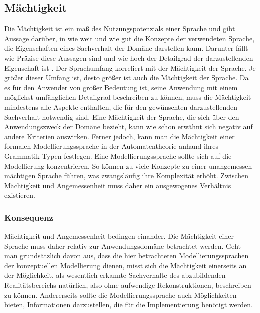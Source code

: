 \subsection{Mächtigkeit}
\label{ssc:Nutzungspotenzial}
Die Mächtigkeit ist ein maß des Nutzungspotenzials einer Sprache und gibt Aussage darüber,
in wie weit und wie gut die Konzepte der verwendeten Sprache, die Eigenschaften eines Sachverhalt der Domäne darstellen kann.
Darunter fällt wie Präzise diese Aussagen sind und wie hoch der Detailgrad der darzustellenden Eigenschaft ist \cite[180]{Allweyer_2005}.
Der Sprachumfang korreliert mit der Mächtigkeit der Sprache. Je größer dieser Umfang ist, desto größer ist auch die Mächtigkeit der Sprache.
Da es für den Anwender von großer Bedeutung ist, seine Anwendung mit einem möglichst umfänglichen Detailgrad beschreiben zu können,
muss die Mächtigkeit mindestens alle Aspekte enthalten, die für den gewünschten darzustellenden Sachverhalt notwendig sind.
Eine Mächtigkeit der Sprache, die sich über den Anwendungszweck der Domäne bezieht, kann wie schon erwähnt sich negativ auf andere Kriterien auswirken.
Ferner jedoch, kann man die Mächtigkeit einer formalen Modellierungssprache in der Automatentheorie anhand ihres Grammatik-Typen festlegen.
Eine Modellierungssprache sollte sich auf die Modellierung konzentrieren.
So können zu viele Konzepte zu einer unangemessen mächtigen Sprache führen, was zwangsläufig ihre Komplexität erhöht. Zwischen Mächtigkeit
und Angemessenheit muss daher ein ausgewogenes Verhältnis existieren.

\subsubsection{Konsequenz}
Mächtigkeit und Angemessenheit bedingen einander. Die Mächtigkeit einer Sprache muss daher relativ
zur Anwendungsdomäne betrachtet werden. Geht man grundsätzlich davon aus, dass die hier betrachteten
Modellierungssprachen der konzeptuellen Modellierung dienen, misst sich die Mächtigkeit einerseits
an der Möglichkeit, als wesentlich erkannte Sachverhalte des abzubildenden Realitätsbereichs
natürlich, also ohne aufwendige Rekonstruktionen, beschreiben zu können. Andererseits sollte die
Modellierungssprache auch Möglichkeiten bieten, Informationen darzustellen, die für die Implementierung
benötigt werden.


